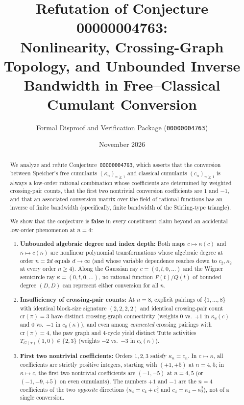 \documentclass[11pt,a4paper]{article}
\title{\textbf{Refutation of Conjecture 00000004763:\\
Nonlinearity, Crossing-Graph Topology, and Unbounded Inverse Bandwidth in Free--Classical Cumulant Conversion}}
\author{Formal Disproof and Verification Package (\texttt{00000004763})}
\date{November 2026}
\theoremstyle{definition}
\theoremstyle{remark}
\newcommand{\crpair}{\mathrm{cr}}
\begin{document}
\maketitle

\begin{abstract}
We analyze and refute Conjecture~\texttt{00000004763}, which asserts that the conversion between Speicher's free cumulants $(\kappa_n)_{n \ge 1}$ and classical cumulants $(c_n)_{n \ge 1}$ is always a low-order rational combination whose coefficients are determined by weighted crossing-pair counts, that the first two nontrivial conversion coefficients are $1$ and $-1$, and that an associated conversion matrix over the field of rational functions has an inverse of finite bandwidth (specifically, finite bandwidth of the Stirling-type triangle).

We show that the conjecture is \textbf{false} in every constituent claim beyond an accidental low-order phenomenon at $n = 4$:
\begin{enumerate}
  \item[(i)] \textbf{Unbounded algebraic degree and index depth:} Both maps $c \mapsto \kappa(c)$ and $\kappa \mapsto c(\kappa)$ are nonlinear polynomial transformations whose algebraic degree at order $n = 2d$ equals $d \to \infty$ (and whose variable dependence reaches down to $c_2,\kappa_2$ at every order $n \ge 4$). Along the Gaussian ray $c = (0,t,0,\dots)$ and the Wigner semicircle ray $\kappa = (0,t,0,\dots)$, no rational function $P(t)/Q(t)$ of bounded degree $(D,D)$ can represent either conversion for all $n$.
  \item[(ii)] \textbf{Insufficiency of crossing-pair counts:} At $n = 8$, explicit pairings of $\{1,\dots,8\}$ with identical block-size signature $(2,2,2,2)$ and identical crossing-pair count $\crpair(\pi) = 3$ have distinct crossing-graph connectivity (weights $0$ vs.\ $+1$ in $\kappa_8(c)$ and $0$ vs.\ $-1$ in $c_8(\kappa)$), and even among \emph{connected} crossing pairings with $\crpair(\pi) = 4$, the paw graph and $4$-cycle yield distinct Tutte activities $T_{G(\pi)}(1,0) \in \{2,3\}$ (weights $-2$ vs.\ $-3$ in $c_8(\kappa)$).
  \item[(iii)] \textbf{First two nontrivial coefficients:} Orders $1,2,3$ satisfy $\kappa_n = c_n$. In $c \mapsto \kappa$, all coefficients are strictly positive integers, starting with $(+1,+5)$ at $n = 4,5$; in $\kappa \mapsto c$, the first two nontrivial coefficients are $(-1,-5)$ at $n = 4,5$ (or $(-1,-9,+5)$ on even cumulants). The numbers $+1$ and $-1$ are the $n = 4$ coefficients of the two \emph{opposite} directions ($\kappa_4 = c_4 + c_2^2$ and $c_4 = \kappa_4 - \kappa_2^2$), not of a single conversion.

\end{enumerate}
\end{abstract}
\end{document}
